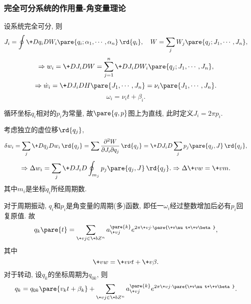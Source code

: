 \documentclass[../TheoreticalMechanics.tex]{subfiles}
\begin{document}

\subsubsection{完全可分系统的作用量-角变量理论} %
\label{ssub:完全可分系统的作用量_角变量理论}

\begin{lemma}[可分系统的角变量]
    设系统完全可分, 则
    \begin{equation}
        \label{eq:可分系统的角变量共轭}
        J_i = \oint \+D{q_i}D{W_i\pare{q_i;\alpha_1,\cdots,\alpha_n}}\,\rd{q_i}, \quad W = \sum_j W_j\pare{q_j;J_1,\cdots,J_n}, 
    \end{equation}
    \begin{equation}
        \label{eq:角变量作为各个分量之和}
        \Rightarrow w_i = \+D{J_i}DW = \sum_{j=1}^n \+D{J_i}D{W_i\pare{q_j;J_1,\cdots,J_n}}, 
    \end{equation}
    \[ \Rightarrow \dot{w}_i = \+D{J_i}D{H\pare{J_1,\cdots,J_n}} = \nu_i\pare{J_1,\cdots,J_n}. \]
    \[ \omega_i = \nu_i t + \beta_i. \]
\end{lemma}
\begin{remark}
    循环坐标$q_i$相对的$p_i$为常量, 故$\pare{q,p}$图上为直线, 此时定义$J_i = 2\pi p_i$.
\end{remark}
\begin{lemma}[角变量对虚位移的变化]
    考虑独立的虚位移$\rd{q_j}$,
    \[ \delta w_i = \sum_j \+D{q_j}D{w_i}\,\rd{q_j} = \sum \frac{\partial^2 W}{\partial J_i\partial q_j}\,\rd{q_j} = \+D{J_i}D{}\sum_j p_j\pare{q_j,J}\,\rd{q_j}, \]
    \[ \Rightarrow \Delta w_i = \sum_j \+D{J_i}D{}\oint_{m_j}p_j\pare{q_j,J}\,\rd{q_j}. \Rightarrow \Delta\+vw = \+vm. \]
    其中$m_i$是坐标$q_i$所经周期数.
\end{lemma}
\begin{finale}
    \begin{lemma}[坐标对角变量的周期性]
        对于周期振动, $q_i$和$p_i$是角变量的周期(多)函数, 即任一$\omega_i$经过整数增加后必有$p_i$回复原值. 故
        \begin{equation}
            \label{eq:坐标对角变量的周期性}
            q_k\pare{t} = \sum_{\+vj\in\+bZ^n}a_{\+vj}^{\pare{k}}e^{2\pi \+vj\cdot\pare{\+v\nu t+\+v\beta}}, 
        \end{equation}
        其中
        \[ \+vw = \+v\nu t + \+v\beta. \]
        对于转动, 设$q_k$的坐标周期为$q_{0k}$, 则
        \[ q_k = q_{0k}\pare{v_k t + \beta_k} + \sum_{\+vj\in\+bZ^n}a_{\+vj}^{\pare{k}}e^{2\pi \+vj\cdot\pare{\+v\nu t+\+v\beta}}. \]
    \end{lemma}
\end{finale}
\end{document}
